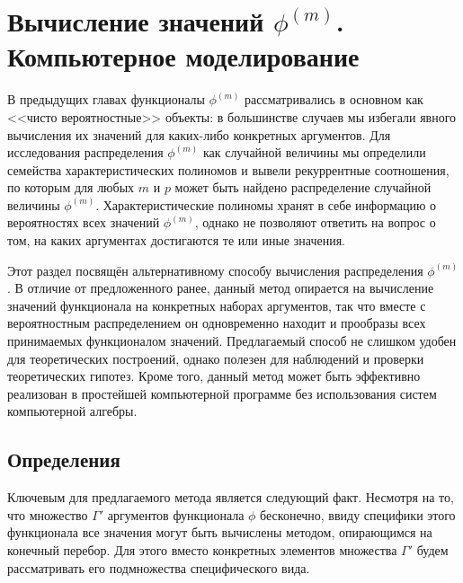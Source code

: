\documentclass[14pt, a4paper, russian]{report}
\begin{document}
\chapter{Вычисление значений $\phi^{(m)}$. Компьютерное моделирование}

В предыдущих главах функционалы $\phi^{(m)}$ рассматривались в основном как <<чисто вероятностные>> объекты: в большинстве случаев мы избегали явного вычисления их значений для каких-либо конкретных аргументов. Для исследования распределения $\phi^{(m)}$ как случайной величины мы определили семейства характеристических полиномов и вывели рекуррентные соотношения, по которым для любых $m$ и $p$ может быть найдено распределение случайной величины $\phi^{(m)}$. Характеристические полиномы хранят в себе информацию о вероятностях всех значений $\phi^{(m)}$, однако не позволяют ответить на вопрос о том, на каких аргументах достигаются те или иные значения.

Этот раздел посвящён альтернативному способу вычисления распределения $\phi^{(m)}$. В отличие от предложенного ранее, данный метод опирается на вычисление значений функционала на конкретных наборах аргументов, так что вместе с вероятностным распределением он одновременно находит и прообразы всех принимаемых функционалом значений. Предлагаемый способ не слишком удобен для теоретических построений, однако полезен для наблюдений и проверки теоретических гипотез. Кроме того, данный метод может быть эффективно реализован в простейшей компьютерной программе без использования систем компьютерной алгебры.

\section{Определения}
Ключевым для предлагаемого метода является следующий факт. Несмотря на то, что множество $\Gamma'$ аргументов функционала $\phi$ бесконечно, ввиду специфики этого функционала все значения могут быть вычислены методом, опирающимся на конечный перебор. Для этого вместо конкретных элементов множества $\Gamma'$ будем рассматривать его подмножества специфического вида.
\end{document}
